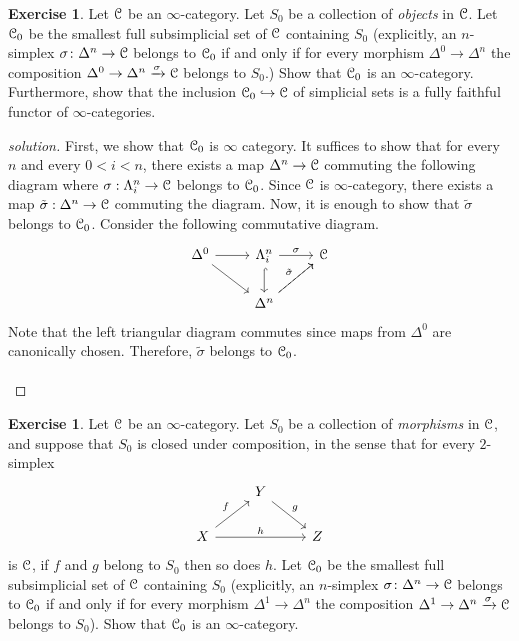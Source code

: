 \documentclass[10pt,a4paper,reqno,oneside]{book} %
\theoremstyle{plain}
\theoremstyle{definition}
\newtheorem{exercise}[thm]{Exercise}
\theoremstyle{remark}
\numberwithin{equation}{section}
\begin{document}
\begin{exercise}
	Let $\mathcal C$ be an $\infty$-category.
	Let $S_0$ be a collection of \emph{objects} in $\mathcal C$.
	Let $\mathcal C_0$ be the smallest full subsimplicial set of $\mathcal C$ containing $S_0$ (explicitly, an $n$-simplex $\sigma \colon \Delta^n \to \mathcal C$ belongs to $\mathcal C_0$ if and only if for every morphism $\Delta^0 \to \Delta^n$ the composition $\Delta^0 \to \Delta^n \xrightarrow{\sigma} \mathcal C$ belongs to $S_0$.)
	Show that $\mathcal C_0$ is an $\infty$-category.
	Furthermore, show that the inclusion $\mathcal C_0 \hookrightarrow \mathcal C$ of simplicial sets is a fully faithful functor of $\infty$-categories.
\end{exercise}

\ifpersonal
\begin{proof}[solution]
    First, we show that $\mathcal C_0$ is $\infty$ category. It suffices to show that for every $n$ and every $0<i<n$, there exists a map $\Delta^n \to \mathcal C$ commuting the following diagram where $\sigma:\Lambda^n_i \to \mathcal C$ belongs to $\mathcal C_0$. Since $\mathcal C$ is $\infty$-category, there exists a map $\tilde{\sigma}:\Delta^n \to \mathcal C$ commuting the diagram. Now, it is enough to show that $\tilde{\sigma}$ belongs to $\mathcal C_0$. Consider the following commutative diagram.
    \[ \begin{tikzcd}
		\Delta^0 \arrow{r} \arrow{dr} & \Lambda^n_i \arrow{r}{\sigma} \arrow[hook]{d} & \cC \\
		{} & \Delta^n \arrow[dashed]{ur}{\tilde{\sigma}} \arrow{ur} & {} 
	\end{tikzcd} \]
	Note that the left triangular diagram commutes since maps from $\Delta^0$ are canonically chosen. Therefore, $\tilde{\sigma}$ belongs to $\mathcal C_0$. \\
	\\
	
\end{proof}
\fi

\begin{exercise}
	Let $\mathcal C$ be an $\infty$-category.
	Let $S_0$ be a collection of \emph{morphisms} in $\mathcal C$, and suppose that $S_0$ is closed under composition, in the sense that for every $2$-simplex
	\[ \begin{tikzcd}
	{} & Y \arrow{dr}{g} \\
	X \arrow{ur}{f} \arrow{rr}{h} & & Z
	\end{tikzcd} \]
	is $\mathcal C$, if $f$ and $g$ belong to $S_0$ then so does $h$.
	Let $\mathcal C_0$ be the smallest full subsimplicial set of $\mathcal C$ containing $S_0$ (explicitly, an $n$-simplex $\sigma \colon \Delta^n \to \mathcal C$ belongs to $\mathcal C_0$ if and only if for every morphism $\Delta^1 \to \Delta^n$ the composition $\Delta^1 \to \Delta^n \xrightarrow{\sigma} \mathcal C$ belongs to $S_0$).
	Show that $\mathcal C_0$ is an $\infty$-category.
\end{exercise}
\end{document}
